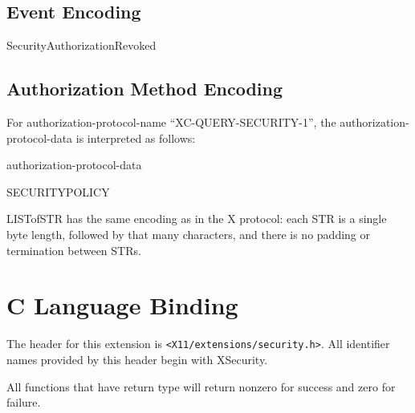 \subsection{Event Encoding}

\begin{eerror}{SecurityAuthorizationRevoked}
\end{eerror}

\subsection{Authorization Method Encoding}

For authorization-protocol-name ``XC-QUERY-SECURITY-1'', the
authorization-protocol-data is interpreted as follows:

\begin{estruct}{authorization-protocol-data}
\end{estruct}

\begin{estruct}{SECURITYPOLICY}
\end{estruct}

LISTofSTR has the same encoding as in the X protocol: each STR is a
single byte length, followed by that many characters, and there is no
padding or termination between STRs.

\section{C Language Binding}

The header for this extension is \verb|<X11/extensions/security.h>|.  All
identifier names provided by this header begin with XSecurity.

All functions that have return type  will return
nonzero for success and zero for failure.


